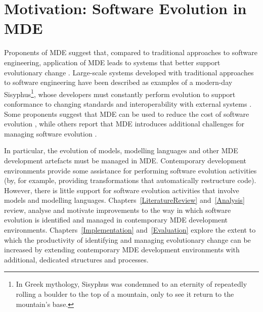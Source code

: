 
\section{Motivation: Software Evolution in MDE}
Proponents of MDE suggest that, compared to traditional approaches to software engineering, application of MDE leads to systems that better support evolutionary change \cite{kleppe03mda}. Large-scale \cc systems developed with traditional approaches to software engineering have been described as examples of a modern-day Sisyphus\footnote{In Greek mythology, Sisyphus was condemned to an eternity of repeatedly rolling a boulder to the top of a mountain, only to see it return to the mountain's base.}, whose developers must constantly perform evolution to support conformance to changing standards and interoperability with external systems \cite{frankel02mda}. Some \cc proponents suggest that MDE can be used to reduce the cost of software evolution \cite{frankel02mda}, while others report that MDE introduces additional challenges for managing software evolution \cite{Mens07}.

In particular, the evolution of models, modelling languages and other MDE development artefacts must be managed in MDE. Contemporary development environments provide some assistance for performing software evolution activities (by, for example, providing transformations that automatically restructure code). However, there is little support for software evolution activities that involve models and modelling languages. Chapters~\ref{LiteratureReview} and~\ref{Analysis} review, analyse and motivate improvements to the way in which software evolution is identified and managed in contemporary MDE development environments. Chapters~\ref{Implementation} and~\ref{Evaluation} explore the extent to which the productivity of identifying and  managing evolutionary change can be increased by extending contemporary MDE development environments with additional, dedicated structures and processes.
